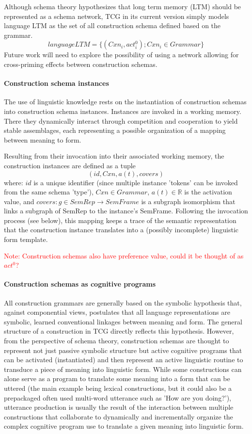 \documentclass{article}
\newcommand\todo[1]{\textcolor{red}{#1}}
\begin{document}
Although schema theory hypothesizes that long term memory (LTM) should be represented as a schema network, TCG in its current version simply models language LTM as the set of all construction schema defined based on the grammar.
$$ language LTM = \lbrace (Cxn_i, act_i^0); Cxn_i \in Grammar \rbrace $$
Future work will need to explore the possibility of using a network allowing for cross-priming effects between construction schemas.

\paragraph{Construction schema instances}

The use of linguistic knowledge rests on the instantiation of construction schemas into construction schema instances. Instances are invoked in a working memory. There they dynamically interact through competition and cooperation to yield stable assemblages, each representing a possible organization of a mapping between meaning to form. 

Resulting from their invocation into their associated working memory, the construction instances are defined as a tuple 
$$(id, Cxn, a(t), covers) $$ 
where: $id$ is a unique identifier (since multiple instance 'tokens' can be invoked from the same schema 'type'), $Cxn \in  Grammar$, $a(t) \in \mathbb{R}$ is the activation value, and $covers: g \in SemRep \rightarrow SemFrame$ is a subgraph isomorphism that links a subgraph of SemRep to the instance's SemFrame. Following the invocation process (see below), this mapping keeps a trace of the semantic representation that the construction instance translates into a (possibly incomplete) linguistic form template.

\todo{Note: Construction schemas also have preference value, could it be thought of as $act^0$?}

\paragraph{Construction schemas as cognitive programs}

All construction grammars are generally based on the symbolic hypothesis that, against componential views, postulates that all language representations are symbolic, learned conventional linkages between meaning and form. The general structure of a construction in TCG directly reflects this hypothesis. However, from the perspective of schema theory, construction schemas are thought to represent not just passive symbolic structure but active cognitive programs that can be activated (instantiated) and then represent an active linguistic routine to transduce a piece of meaning into linguistic form. While some constructions can alone serve as a program to translate some meaning into a form that can be uttered (the main example being lexical constructions, but it could also be a prepackaged often used multi-word utterance such as 'How are you doing?'), utterance production is usually the result of the interaction between multiple constructions that collaborate to dynamically and incrementally organize the complex cognitive program use to translate a given meaning into linguistic form.
\end{document}
